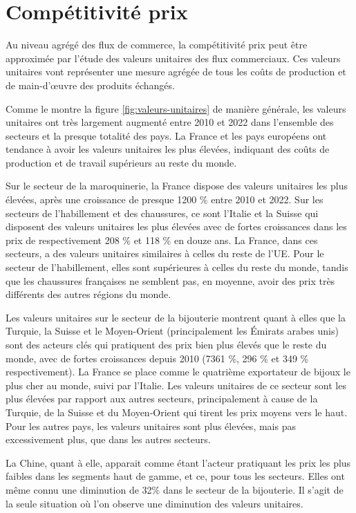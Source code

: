\documentclass[french,10pt,a4paper]{article}
\begin{document}
\section{Compétitivité prix}
Au niveau agrégé des flux de commerce, la compétitivité prix peut être approximée par l'étude des valeurs unitaires des flux commerciaux. Ces valeurs unitaires vont représenter une mesure agrégée de tous les coûts de production et de main-d'œuvre des produits échangés.

Comme le montre la figure \ref{fig:valeurs-unitaires} de manière générale, les valeurs unitaires ont très largement augmenté entre 2010 et 2022 dans l'ensemble des secteurs et la presque totalité des pays. La France et les pays européens ont tendance à avoir les valeurs unitaires les plus élevées, indiquant des coûts de production et de travail supérieurs au reste du monde.

Sur le secteur de la maroquinerie, la France dispose des valeurs unitaires les plus élevées, après une croissance de presque 1200 \% entre 2010 et 2022. Sur les secteurs de l'habillement et des chaussures, ce sont l'Italie et la Suisse qui disposent des valeurs unitaires les plus élevées avec de fortes croissances dans les prix de respectivement 208 \% et 118 \% en douze ans. La France, dans ces secteurs, a des valeurs unitaires similaires à celles du reste de l'UE. Pour le secteur de l'habillement, elles sont supérieures à celles du reste du monde, tandis que les chaussures françaises ne semblent pas, en moyenne, avoir des prix très différents des autres régions du monde. 

Les valeurs unitaires sur le secteur de la bijouterie montrent quant à elles que la Turquie, la Suisse et le Moyen-Orient (principalement les Émirats arabes unis) sont des acteurs clés qui pratiquent des prix bien plus élevés que le reste du monde, avec de fortes croissances depuis 2010 (7361 \%, 296 \% et 349 \% respectivement). La France se place comme le quatrième exportateur de bijoux le plus cher au monde, suivi par l'Italie. Les valeurs unitaires de ce secteur sont les plus élevées par rapport aux autres secteurs, principalement à cause de la Turquie, de la Suisse et du Moyen-Orient qui tirent les prix moyens vers le haut. Pour les autres pays, les valeurs unitaires sont plus élevées, mais pas excessivement plus, que dans les autres secteurs. 

La Chine, quant à elle, apparait comme étant l'acteur pratiquant les prix les plus faibles dans les segments haut de gamme, et ce, pour tous les secteurs. Elles ont même connu une diminution de 32\% dans le secteur de la bijouterie. Il s'agit de la seule situation où l'on observe une diminution des valeurs unitaires.
\end{document}
